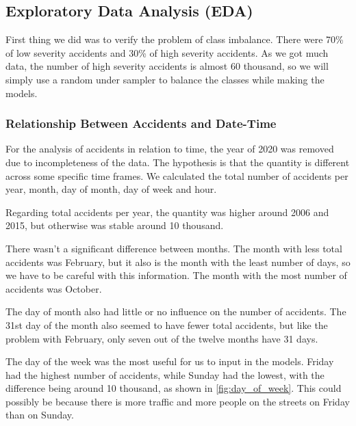 \documentclass[12pt]{article}
\begin{document}
\subsection{Exploratory Data Analysis (EDA)}

First thing we did was to verify the problem of class imbalance. There were 70\% of low severity accidents and 30\% of high severity accidents. As we got much data, the number of high severity accidents is almost 60 thousand, so we will simply use a random under sampler to balance the classes while making the models.

\subsubsection{Relationship Between Accidents and Date-Time}

For the analysis of accidents in relation to time, the year of 2020 was removed due to incompleteness of the data. The hypothesis is that the quantity is different across some specific time frames. We calculated the total number of accidents per year, month, day of month, day of week and hour.

Regarding total accidents per year, the quantity was higher around 2006 and 2015, but otherwise was stable around 10 thousand.

There wasn't a significant difference between months. The month with less total accidents was February, but it also is the month with the least number of days, so we have to be careful with this information. The month with the most number of accidents was October.


The day of month also had little or no influence on the number of accidents. The 31st day of the month also seemed to have fewer total accidents, but like the problem with February, only seven out of the twelve months have 31 days.

The day of the week was the most useful for us to input in the models. Friday had the highest number of accidents, while Sunday had the lowest, with the difference being around 10 thousand, as shown in \autoref{fig:day_of_week}. This could possibly be because there is more traffic and more people on the streets on Friday than on Sunday.
\end{document}
